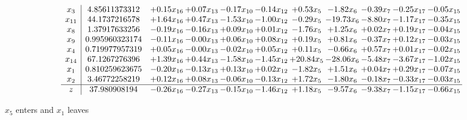 \documentclass[9pt]{article}
\begin{document}
 \[\begin{array}{c| c c@{\hskip 2pt} c@{\hskip 2pt} c@{\hskip 2pt} c@{\hskip 2pt} c@{\hskip 2pt} c@{\hskip 2pt} c@{\hskip 2pt} c@{\hskip 2pt} c@{\hskip 2pt} }
 x_{3}   &  4.85611373312 & +  0.15 x_{16} & +  0.07 x_{13} & -0.17 x_{10} & -0.14 x_{12} & +  0.53 x_{5} & -1.82 x_{6} & -0.39 x_{7} & -0.25 x_{17} & -0.05 x_{15}\\
 x_{11}   &  44.1737216578 & +  1.64 x_{16} & +  0.47 x_{13} & -1.53 x_{10} & -1.00 x_{12} & -0.29 x_{5} & -19.73 x_{6} & -8.80 x_{7} & -1.17 x_{17} & -0.35 x_{15}\\
 x_{8}   &  1.37917633256 & -0.19 x_{16} & -0.16 x_{13} & +  0.09 x_{10} & +  0.01 x_{12} & -1.76 x_{5} & +  1.25 x_{6} & +  0.02 x_{7} & +  0.19 x_{17} & -0.04 x_{15}\\
 x_{9}   &  0.995960323174 & -0.11 x_{16} & -0.00 x_{13} & +  0.06 x_{10} & +  0.08 x_{12} & +  0.19 x_{5} & +  0.81 x_{6} & -0.37 x_{7} & +  0.12 x_{17} & -0.03 x_{15}\\
 x_{4}   &  0.719977957319 & +  0.05 x_{16} & -0.00 x_{13} & -0.02 x_{10} & +  0.05 x_{12} & +  0.11 x_{5} & -0.66 x_{6} & +  0.57 x_{7} & +  0.01 x_{17} & -0.02 x_{15}\\
 x_{14}   &  67.1267276396 & +  1.39 x_{16} & +  0.44 x_{13} & -1.58 x_{10} & -1.45 x_{12} & + 20.84 x_{5} & -28.06 x_{6} & -5.48 x_{7} & -3.67 x_{17} & -1.02 x_{15}\\
 x_{1}   &  0.810259623675 & -0.20 x_{16} & -0.13 x_{13} & +  0.13 x_{10} & +  0.02 x_{12} & -1.82 x_{5} & +  1.51 x_{6} & +  0.04 x_{7} & +  0.29 x_{17} & -0.07 x_{15}\\
 x_{2}   &  3.46772258219 & +  0.12 x_{16} & +  0.08 x_{13} & -0.06 x_{10} & -0.13 x_{12} & +  1.72 x_{5} & -1.80 x_{6} & -0.18 x_{7} & -0.33 x_{17} & -0.03 x_{15}\\
\hline
z    &  37.980908194 & -0.26 x_{16} & -0.27 x_{13} & -0.15 x_{10} & -1.46 x_{12} & +  1.18 x_{5} & -9.57 x_{6} & -9.38 x_{7} & -1.15 x_{17} & -0.66 x_{15}\\
\end{array}\]


 $ x_{5} $ enters and $ x_{1} $ leaves 
\end{document}

